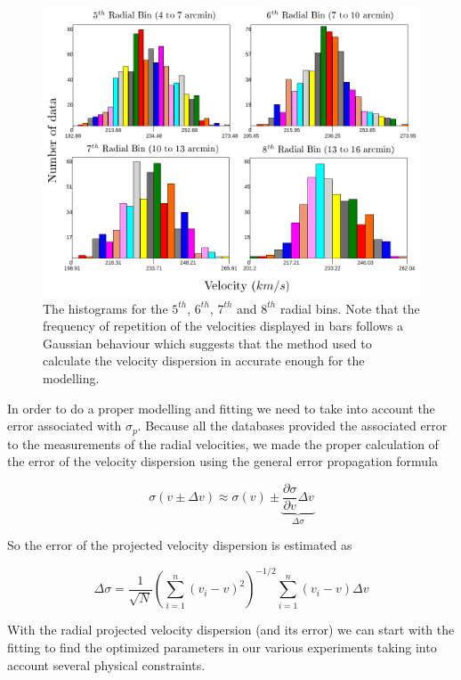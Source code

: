 \begin{figure}[]
\centering
\includegraphics[width=15cm]{images/bines.png}
\caption[Histograms for some of the radial bins in our profile]{The histograms for the $5^{th}$, $6^{th}$, $7^{th}$ and $8^{th}$ radial bins. Note that the frequency of repetition of the velocities displayed in bars follows a Gaussian behaviour which suggests that the method used to calculate the velocity dispersion in accurate enough for the modelling.}
\end{figure}

In order to do a proper modelling and fitting we need to take into account the error associated with $\sigma_{p}$. Because all the databases provided the associated error to the measurements of the radial velocities, we made the proper calculation of the error of the velocity dispersion using the general error propagation formula

\begin{equation}
\sigma(v\pm\Delta v)\approx \sigma(v)\pm \underbrace{\frac{\partial \sigma}{\partial v}\Delta v}_{\Delta \sigma}
\end{equation}

So the error of the projected velocity dispersion is estimated as

\begin{equation}
\Delta \sigma = \frac{1}{\sqrt{N}}\left(\sum_{i=1}^{n}\left(v_{i}-v\right)^{2}\right)^{-1/2}\sum_{i=1}^{n}\left(v_{i}-v\right)\Delta v
\end{equation}

With the radial projected velocity dispersion (and its error) we can start with the fitting to find the optimized parameters in our various experiments taking into account several physical constraints. 

